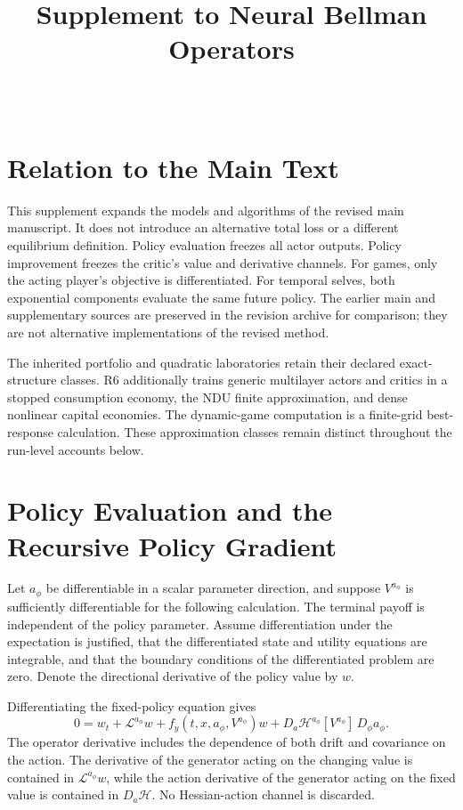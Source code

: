 \documentclass[ecta,draft]{econsocart}
\newcommand{\HH}{\mathcal H}
\newcommand{\LL}{\mathcal L}
\begin{document}
\begin{frontmatter}
\title{Supplement to Neural Bellman Operators}
\begin{aug}
\author[id=au1,addressref={add1}]{~}
\address[id=add1]{Peking University}
\end{aug}
\end{frontmatter}

\section{Relation to the Main Text}
This supplement expands the models and algorithms of the revised main manuscript. It does not introduce an alternative total loss or a different equilibrium definition. Policy evaluation freezes all actor outputs. Policy improvement freezes the critic's value and derivative channels. For games, only the acting player's objective is differentiated. For temporal selves, both exponential components evaluate the same future policy. The earlier main and supplementary sources are preserved in the revision archive for comparison; they are not alternative implementations of the revised method.

The inherited portfolio and quadratic laboratories retain their declared exact-structure classes. R6 additionally trains generic multilayer actors and critics in a stopped consumption economy, the NDU finite approximation, and dense nonlinear capital economies. The dynamic-game computation is a finite-grid best-response calculation. These approximation classes remain distinct throughout the run-level accounts below.

\section{Policy Evaluation and the Recursive Policy Gradient}
Let $a_\phi$ be differentiable in a scalar parameter direction, and suppose $V^{a_\phi}$ is sufficiently differentiable for the following calculation. The terminal payoff is independent of the policy parameter. Assume differentiation under the expectation is justified, that the differentiated state and utility equations are integrable, and that the boundary conditions of the differentiated problem are zero. Denote the directional derivative of the policy value by $w$.

Differentiating the fixed-policy equation gives
\[
 0=w_t+\LL^{a_\phi}w+f_y(t,x,a_\phi,V^{a_\phi})w
  +D_a\HH^{a_\phi}[V^{a_\phi}]\,D_\phi a_\phi.
\]
The operator derivative includes the dependence of both drift and covariance on the action. The derivative of the generator acting on the changing value is contained in $\LL^{a_\phi}w$, while the action derivative of the generator acting on the fixed value is contained in $D_a\HH$. No Hessian-action channel is discarded.
\end{document}
